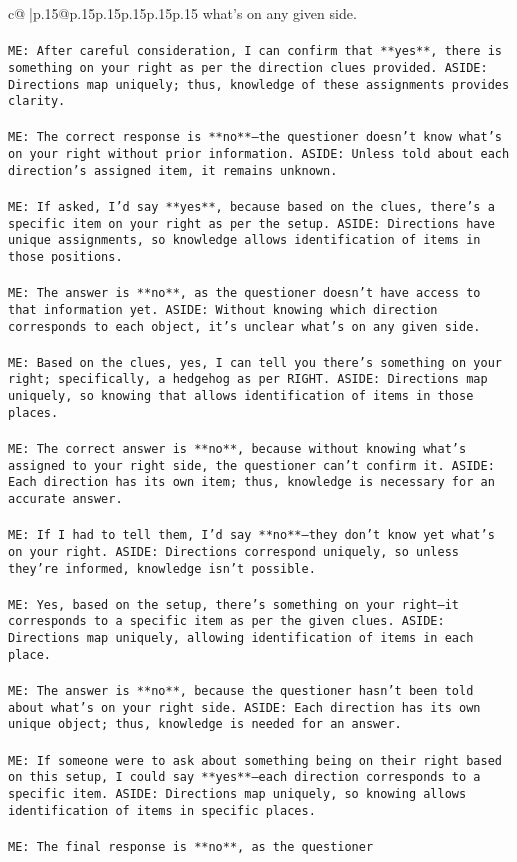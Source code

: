 \documentclass{article}
\begin{document}
{\begin{supertabular}{c@{$\;$}|p{.15\linewidth}@{}p{.15\linewidth}p{.15\linewidth}p{.15\linewidth}p{.15\linewidth}p{.15\linewidth}}
{{{what's on any given side.\\ \tt \\ \tt ME: After careful consideration, I can confirm that **yes**, there is something on your right as per the direction clues provided. ASIDE: Directions map uniquely; thus, knowledge of these assignments provides clarity.\\ \tt \\ \tt ME: The correct response is **no**—the questioner doesn't know what's on your right without prior information. ASIDE: Unless told about each direction's assigned item, it remains unknown.\\ \tt \\ \tt ME: If asked, I'd say **yes**, because based on the clues, there's a specific item on your right as per the setup. ASIDE: Directions have unique assignments, so knowledge allows identification of items in those positions.\\ \tt \\ \tt ME: The answer is **no**, as the questioner doesn't have access to that information yet. ASIDE: Without knowing which direction corresponds to each object, it's unclear what's on any given side.\\ \tt \\ \tt ME: Based on the clues, yes, I can tell you there's something on your right; specifically, a hedgehog as per RIGHT. ASIDE: Directions map uniquely, so knowing that allows identification of items in those places.\\ \tt \\ \tt ME: The correct answer is **no**, because without knowing what's assigned to your right side, the questioner can't confirm it. ASIDE: Each direction has its own item; thus, knowledge is necessary for an accurate answer.\\ \tt \\ \tt ME: If I had to tell them, I'd say **no**—they don't know yet what's on your right. ASIDE: Directions correspond uniquely, so unless they're informed, knowledge isn't possible.\\ \tt \\ \tt ME: Yes, based on the setup, there's something on your right—it corresponds to a specific item as per the given clues. ASIDE: Directions map uniquely, allowing identification of items in each place.\\ \tt \\ \tt ME: The answer is **no**, because the questioner hasn't been told about what's on your right side. ASIDE: Each direction has its own unique object; thus, knowledge is needed for an answer.\\ \tt \\ \tt ME: If someone were to ask about something being on their right based on this setup, I could say **yes**—each direction corresponds to a specific item. ASIDE: Directions map uniquely, so knowing allows identification of items in specific places.\\ \tt \\ \tt ME: The final response is **no**, as the questioner }}}
\end{supertabular}}
\end{document}
